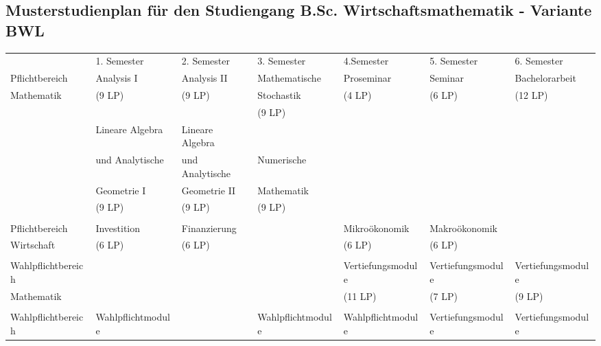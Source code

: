 \clearpage

\subsection{Musterstudienplan für den Studiengang B.Sc.  Wirtschaftsmathematik
- Variante BWL}

\begin{center}
\begin{tabular}{||l||l|l|l|l|l|l||}
\hhline{|t:=:t:=t=t=t=t=t=:t|}
\hspace*{25mm}&1. Semester\hspace*{8ex}&2. Semester\hspace*{8ex}&3. Semester\hspace*{8ex}&4.Semester\hspace*{8ex}&5. Semester\hspace*{8ex}&6. Semester\hspace*{8ex}\\
\hhline{|:=::======:|} Pflichtbereich&Analysis I&Analysis II&Mathematische& Proseminar &Seminar& Bachelorarbeit\\
\hhline{||~||~|~|~|~|~|~||} Mathematik &(9 LP)&(9 LP)&Stochastik&(4 LP) &(6 LP)& (12 LP)\\
\hhline{||~||~|~|~|~|~|~||} &&&(9 LP)&&&\\
\hhline{||~||~|~|~|~|~|~||} &Lineare Algebra&Lineare Algebra&&&&\\ 
\hhline{||~||~|~|~|~|~|~||} &und Analytische &und Analytische&Numerische& & &\\ 
\hhline{||~||~|~|~|~|~|~||} &Geometrie I&Geometrie II&Mathematik&&&\\ 
\hhline{||~||~|~|~|~|~|~||} &(9 LP)&(9 LP)&(9 LP)&&&\\
\hhline{||~||~|~|~|~|~|~||} &&&&&&\\
\hhline{|:=::======:|} Pflichtbereich&Investition&Finanzierung&&Mikroökonomik&Makroökonomik&\\
\hhline{||~||~|~|~|~|~|~||} Wirtschaft  &  (6 LP)  &(6 LP) &   &(6 LP) &  (6 LP)  &\\
\hhline{||~||~|~|~|~|~|~||} &&&&&&\\
\hhline{|:=::======:|} Wahlpflichtbereich&&&&Vertiefungsmodule&Vertiefungsmodule&Vertiefungsmodule \\
\hhline{||~||~|~|~|~|~|~||} Mathematik&&&&(11 LP)&(7 LP)&(9 LP)\\
\hhline{||~||~|~|~|~|~|~||} &&&&&&\\
\hhline{|:=::=|=|=|=|=|=:|} Wahlpflichtbereich&Wahlpflichtmodule&&Wahlpflichtmodule &Wahlpflichtmodule&Vertiefungsmodule&Vertiefungsmodule \\

\end{tabular}
\end{center}
